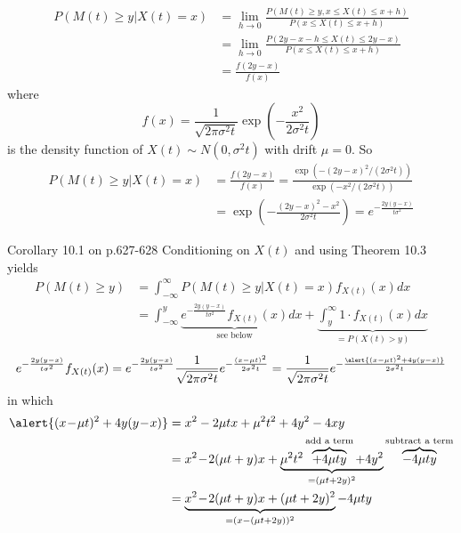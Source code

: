 \documentclass[letterpaper,handout]{beamer}
\begin{document}
\begin{frame}

\begin{align*}
P(M(t) \ge y|X(t) = x)
&=\lim_{h\to 0}\frac{P(M(t) \ge y, x\le X(t) \le x+h)}{P(x\le X(t) \le x+h)}\\
&=\lim_{h\to 0}\frac{P(2y-x-h\le X(t) \le 2y-x)}{P(x\le X(t) \le x+h)}\\
&=\frac{f(2y-x)}{f(x)}
\end{align*}
where
\[
f(x)=\frac{1}{\sqrt{2\pi\sigma^2t}}\exp\left(-\frac{x^2}{2\sigma^2t}\right)
\]
is the density function of $X(t)\sim N(0,\sigma^2t)$ with drift $\mu=0$.
So
\begin{align*}
P(M(t) \ge y|X(t) = x)
&=\frac{f(2y-x)}{f(x)}
=\frac{\exp(-(2y-x)^2/(2\sigma^2t))}{\exp(-x^2/(2\sigma^2t))}\\
&=\exp\left(-\frac{(2y-x)^2-x^2}{2\sigma^2t}\right)
=e^{-\frac{2y(y-x)}{t\sigma^2}}
\end{align*}
\end{frame}
\begin{frame}{Corollary 10.1 on p.627-628}\small
Conditioning on $X(t)$ and using Theorem 10.3 yields
\begin{align*}
P(M(t) \ge y)
&=\int_{-\infty}^{\infty}P(M(t) \ge y|X(t) = x)f_{X(t)}(x)dx\\
&=\int_{-\infty}^y\underbrace{e^{-\frac{2y(y-x)}{t\sigma^2}}f_{X(t)}(x)}_{\text{see below}}dx+
\underbrace{\int_y^{\infty}1\cdot f_{X(t)}(x)dx}_{=P(X(t)>y)}
\end{align*}
\[
e^{-\frac{2y(y-x)}{t\sigma^2}}f_{X(t)}(x)
=e^{-\frac{2y(y-x)}{t\sigma^2}}\frac{1}{\sqrt{2\pi\sigma^2t}}e^{-\frac{(x-\mu t)^2}{2\sigma^2t}}
=\frac{1}{\sqrt{2\pi\sigma^2t}}e^{-\frac{\alert{(x-\mu t)^2+4y(y-x)}}{2\sigma^2t}}
\]
in which
\begin{align*}
\alert{(x\!-\!\mu t)^2+4y(y\!-\!x)}&=x^2-2\mu tx+\mu^2t^2+4y^2-4xy\\
&=x^2\!-\!2(\mu t+y)x
+\underbrace{\mu^2t^2\overbrace{+4\mu t y}^{\text{add a term}}+4y^2}_{=(\mu t+2y)^2}\overbrace{-4\mu t y}^{\text{subtract a term}}\\
&=\underbrace{x^2\!-\!2(\mu t+y)x+(\mu t+2y)^2}_{=(x-(\mu t+2y))^2}-4\mu t y
\end{align*}
\end{frame}
\end{document}
